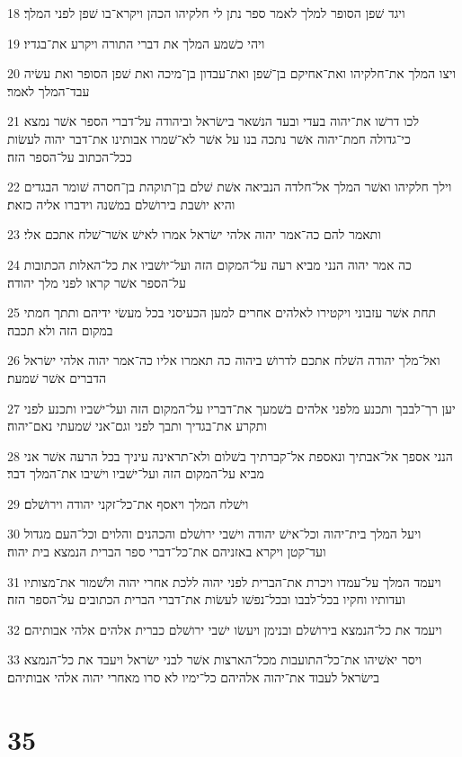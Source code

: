 \par 18 ויגד שׁפן הסופר למלך לאמר ספר נתן לי חלקיהו הכהן ויקרא־בו שׁפן לפני המלך׃
\par 19 ויהי כשׁמע המלך את דברי התורה ויקרע את־בגדיו׃
\par 20 ויצו המלך את־חלקיהו ואת־אחיקם בן־שׁפן ואת־עבדון בן־מיכה ואת שׁפן הסופר ואת עשׂיה עבד־המלך לאמר׃
\par 21 לכו דרשׁו את־יהוה בעדי ובעד הנשׁאר בישׂראל וביהודה על־דברי הספר אשׁר נמצא כי־גדולה חמת־יהוה אשׁר נתכה בנו על אשׁר לא־שׁמרו אבותינו את־דבר יהוה לעשׂות ככל־הכתוב על־הספר הזה׃
\par 22 וילך חלקיהו ואשׁר המלך אל־חלדה הנביאה אשׁת שׁלם בן־תוקהת בן־חסרה שׁומר הבגדים והיא יושׁבת בירושׁלם במשׁנה וידברו אליה כזאת׃
\par 23 ותאמר להם כה־אמר יהוה אלהי ישׂראל אמרו לאישׁ אשׁר־שׁלח אתכם אלי׃
\par 24 כה אמר יהוה הנני מביא רעה על־המקום הזה ועל־יושׁביו את כל־האלות הכתובות על־הספר אשׁר קראו לפני מלך יהודה׃
\par 25 תחת אשׁר עזבוני ויקטירו לאלהים אחרים למען הכעיסני בכל מעשׂי ידיהם ותתך חמתי במקום הזה ולא תכבה׃
\par 26 ואל־מלך יהודה השׁלח אתכם לדרושׁ ביהוה כה תאמרו אליו כה־אמר יהוה אלהי ישׂראל הדברים אשׁר שׁמעת׃
\par 27 יען רך־לבבך ותכנע מלפני אלהים בשׁמעך את־דבריו על־המקום הזה ועל־ישׁביו ותכנע לפני ותקרע את־בגדיך ותבך לפני וגם־אני שׁמעתי נאם־יהוה׃
\par 28 הנני אספך אל־אבתיך ונאספת אל־קברתיך בשׁלום ולא־תראינה עיניך בכל הרעה אשׁר אני מביא על־המקום הזה ועל־ישׁביו וישׁיבו את־המלך דבר׃
\par 29 וישׁלח המלך ויאסף את־כל־זקני יהודה וירושׁלם׃
\par 30 ויעל המלך בית־יהוה וכל־אישׁ יהודה וישׁבי ירושׁלם והכהנים והלוים וכל־העם מגדול ועד־קטן ויקרא באזניהם את־כל־דברי ספר הברית הנמצא בית יהוה׃
\par 31 ויעמד המלך על־עמדו ויכרת את־הברית לפני יהוה ללכת אחרי יהוה ולשׁמור את־מצותיו ועדותיו וחקיו בכל־לבבו ובכל־נפשׁו לעשׂות את־דברי הברית הכתובים על־הספר הזה׃
\par 32 ויעמד את כל־הנמצא בירושׁלם ובנימן ויעשׂו ישׁבי ירושׁלם כברית אלהים אלהי אבותיהם׃
\par 33 ויסר יאשׁיהו את־כל־התועבות מכל־הארצות אשׁר לבני ישׂראל ויעבד את כל־הנמצא בישׂראל לעבוד את־יהוה אלהיהם כל־ימיו לא סרו מאחרי יהוה אלהי אבותיהם׃

\chapter{35}

